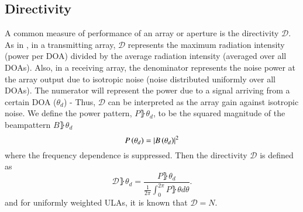 \subsection{Directivity}
A common measure of performance of an array or aperture is the directivity $\mathcal{D}$.
As in \cite{van2004optimum}, in a transmitting array, $\mathcal{D}$ represents the maximum radiation intensity (power per DOA) divided by the average radiation intensity (averaged over all DOAs).
Also, in a receiving array, the denominator represents the noise power at the array output due to isotropic noise (noise distributed uniformly over all DOAs). 
The numerator will represent the power due to a signal arriving from a certain DOA ($\theta_{d}$) - Thus, $\mathcal{D}$ can be interpreted as the array gain against isotropic noise.
We define the power pattern, $P\rBrace{\theta_{d}}$, to be the squared magnitude of the beampattern $B\rBrace{\theta_{d}}$
\begin{equation}
    P\left({\theta_{d}}\right) = \left\vert B\left({\theta_{d}}\right)\right\vert^{2}
\end{equation}
where the frequency dependence is suppressed.
Then the directivity $\mathcal{D}$ is defined as
\begin{equation}\label{eq_D}
    \mathcal{D}\rBrace{\theta_{d}} = \frac{
    P\rBrace{\theta_{d}}
    }{
    \frac{1}{2\pi}\int_{0}^{2\pi}P\rBrace{\theta}d\theta
    }.
\end{equation}
and for uniformly weighted ULAs, it is known \cite{van2004optimum} that $\mathcal{D} = N$.
